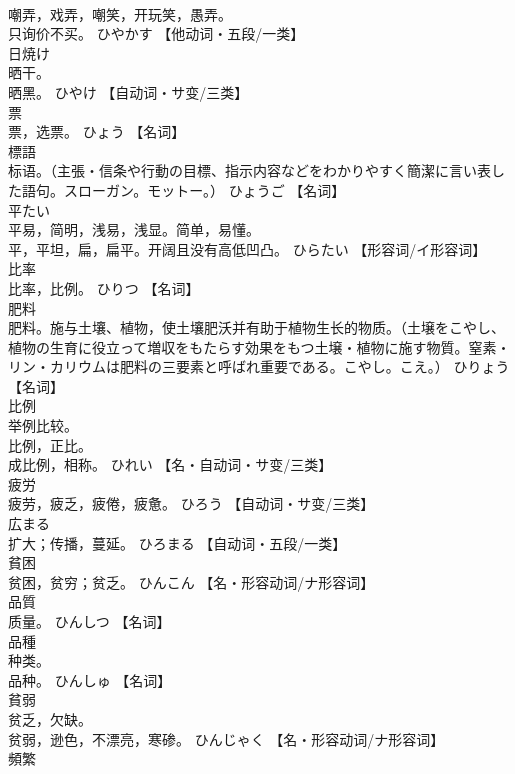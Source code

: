 \documentclass[8pt]{extreport}
\begin{document}
\begin{CJK}{UTF8}{min}
\\	嘲弄，戏弄，嘲笑，开玩笑，愚弄。 
\\	只询价不买。	ひやかす		【他动词・五段/一类】
\\	日焼け	
\\	晒干。 
\\	晒黑。	ひやけ		【自动词・サ变/三类】
\\	票	
\\	票，选票。	ひょう		【名词】
\\	標語	
\\	标语。（主張・信条や行動の目標、指示内容などをわかりやすく簡潔に言い表した語句。スローガン。モットー。）	ひょうご		【名词】
\\	平たい	
\\	平易，简明，浅易，浅显。简单，易懂。 
\\	平，平坦，扁，扁平。开阔且没有高低凹凸。	ひらたい		【形容词/イ形容词】
\\	比率	
\\	比率，比例。	ひりつ		【名词】
\\	肥料	
\\	肥料。施与土壤、植物，使土壤肥沃并有助于植物生长的物质。（土壌をこやし、植物の生育に役立って増収をもたらす効果をもつ土壌・植物に施す物質。窒素・リン・カリウムは肥料の三要素と呼ばれ重要である。こやし。こえ。）	ひりょう		【名词】
\\	比例	
\\	举例比较。 
\\	比例，正比。 
\\	成比例，相称。	ひれい		【名・自动词・サ变/三类】
\\	疲労	
\\	疲劳，疲乏，疲倦，疲惫。	ひろう		【自动词・サ变/三类】
\\	広まる	
\\	扩大；传播，蔓延。	ひろまる		【自动词・五段/一类】
\\	貧困	
\\	贫困，贫穷；贫乏。	ひんこん		【名・形容动词/ナ形容词】
\\	品質	
\\	质量。	ひんしつ		【名词】
\\	品種	
\\	种类。 
\\	品种。	ひんしゅ		【名词】
\\	貧弱	
\\	贫乏，欠缺。 
\\	贫弱，逊色，不漂亮，寒碜。	ひんじゃく		【名・形容动词/ナ形容词】
\\	頻繁	

\end{CJK}
\end{document}
